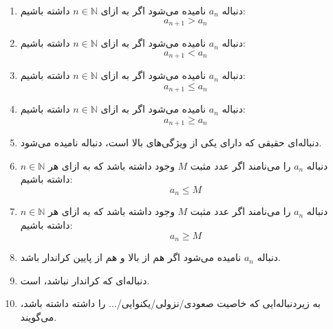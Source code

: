 \begin{DEFINITION}
\begin{enumerate}
\item
 دنباله
$a_n$
  نامیده می‌شود اگر به ازای
$n \in \mathbb{N}$
 داشته باشیم:
$$a_{n+1} > a_n$$

\item
 دنباله
$a_n$
  نامیده می‌شود اگر به ازای
$n \in \mathbb{N}$
 داشته باشیم:
$$a_{n+1} < a_n$$

\item
 دنباله
$a_n$
  نامیده می‌شود اگر به ازای
$n \in \mathbb{N}$
 داشته باشیم:
$$a_{n+1} \leq a_n$$

\item
 دنباله
$a_n$
  نامیده می‌شود اگر به ازای
$n \in \mathbb{N}$
 داشته باشیم:
$$a_{n+1} \geq a_n$$

\item
 دنباله‌ای حقیقی  که دارای یکی از ویژگی‌های بالا است، دنباله 
 نامیده می‌شود.

\item
 دنباله
$a_n$
 را  
  می‌نامند اگر عدد مثبت 
 $M$
 وجود داشته باشد که به ازای هر
$n \in \mathbb{N}$
 داشته باشیم:
$$a_{n} \leq M$$

\item
 دنباله
$a_n$
 را 
  می‌نامند اگر عدد مثبت 
 $M$
 وجود داشته باشد که به ازای هر
$n \in \mathbb{N}$
 داشته باشیم:
$$a_{n} \geq M$$

\item
 دنباله
$a_n$
 نامیده می‌شود اگر هم از بالا و هم از پایین کراندار باشد.

\item
دنباله‌ای که کراندار نباشد، 
 است.

\item 
به زیردنباله‌ایی که خاصیت صعودی/نزولی/یکنوایی/... را داشته داشته باشد، 
 می‌گویند.

\end{enumerate}
\end{DEFINITION}

